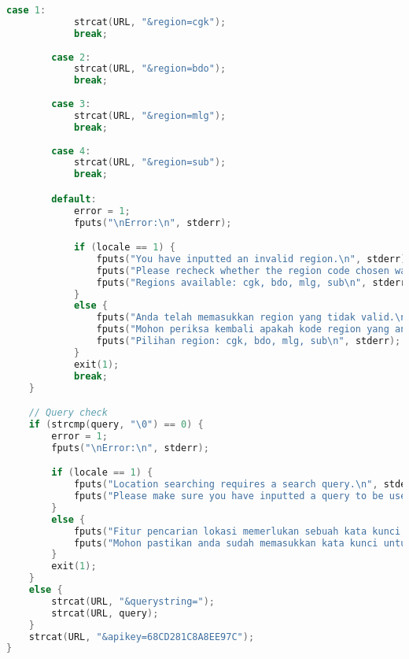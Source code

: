 \begin{lstlisting}[label={appdx:A-buildurl-searchplace}, language=C, caption=\texttt{build\textunderscore url\textunderscore searchplace()}]
        case 1:
            strcat(URL, "&region=cgk");
            break;
        
        case 2:
            strcat(URL, "&region=bdo");
            break;
        
        case 3:
            strcat(URL, "&region=mlg");
            break;
        
        case 4:
            strcat(URL, "&region=sub");
            break;

        default:
            error = 1;
            fputs("\nError:\n", stderr);

            if (locale == 1) {
                fputs("You have inputted an invalid region.\n", stderr);
                fputs("Please recheck whether the region code chosen was one of the four region codes supported.\n", stderr);
                fputs("Regions available: cgk, bdo, mlg, sub\n", stderr);
            }
            else {
                fputs("Anda telah memasukkan region yang tidak valid.\n", stderr);
                fputs("Mohon periksa kembali apakah kode region yang anda masukkan merupakan salah satu dari empat kode region yang tersedia.\n", stderr);
                fputs("Pilihan region: cgk, bdo, mlg, sub\n", stderr);
            }
            exit(1);
            break;
    }

    // Query check
    if (strcmp(query, "\0") == 0) {
        error = 1;
        fputs("\nError:\n", stderr);

        if (locale == 1) {
            fputs("Location searching requires a search query.\n", stderr);
            fputs("Please make sure you have inputted a query to be used in the search.\n", stderr);
        }
        else {
            fputs("Fitur pencarian lokasi memerlukan sebuah kata kunci pencarian.\n", stderr);
            fputs("Mohon pastikan anda sudah memasukkan kata kunci untuk melakukan pencarian lokasi.\n", stderr);
        }
        exit(1);
    }
    else {
        strcat(URL, "&querystring=");
        strcat(URL, query);
    }
    strcat(URL, "&apikey=68CD281C8A8EE97C");
}
\end{lstlisting}

